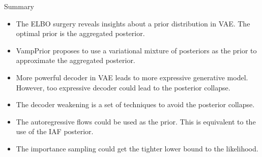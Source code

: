 \begin{frame}{Summary}
	\begin{itemize}
		\item The ELBO surgery reveals insights about a prior distribution in VAE. The optimal prior is the aggregated posterior.
		\item VampPrior proposes to use a variational mixture of posteriors as the prior to approximate the aggregated posterior.
		\item More powerful decoder in VAE leads to more expressive generative model. However, too expressive decoder could lead to the posterior collapse.
		\item The decoder weakening is a set of techniques to avoid the posterior collapse.
		\item The autoregressive flows could be used as the prior. This is equivalent to the use of the IAF posterior. 
		\item The importance sampling could get the tighter lower bound to the likelihood.
	\end{itemize}
\end{frame}
